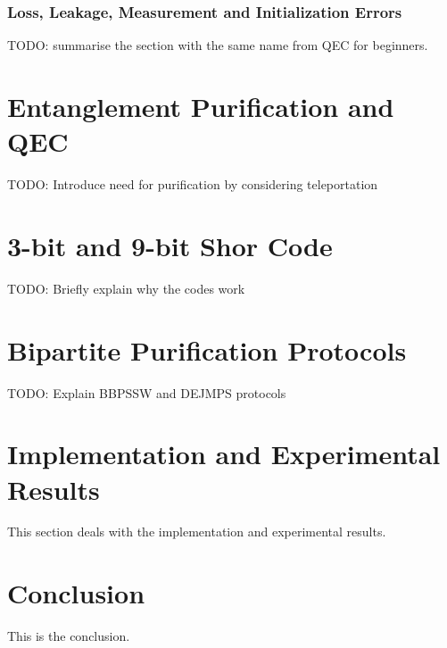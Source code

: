 \documentclass[conference]{IEEEtran}
\begin{document}
\vspace{4pt}
\subsubsection{Loss, Leakage, Measurement and Initialization Errors}
TODO: summarise the section with the same name from QEC for beginners.

\section{Entanglement Purification and QEC}
TODO: Introduce need for purification by considering teleportation

\section{3-bit and 9-bit Shor Code}
TODO: Briefly explain why the codes work \cite{paper1}

\section{Bipartite Purification Protocols}
TODO: Explain BBPSSW and DEJMPS protocols \cite{paper2}

\section{Implementation and Experimental Results}
This section deals with the implementation and experimental results.

\section{Conclusion}
This is the conclusion.



\end{document}
